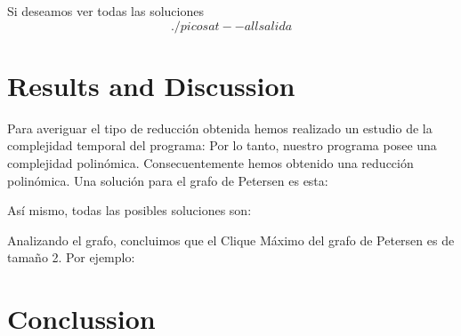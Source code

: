 \documentclass{article}
\begin{document}
        Si deseamos ver todas las soluciones 
        \[./picosat --all salida\]


\section{Results and Discussion}
    Para averiguar el tipo de reducción obtenida hemos realizado un estudio de la complejidad temporal del programa: 
    Por lo tanto, nuestro programa posee una complejidad polinómica. Consecuentemente hemos obtenido una reducción polinómica.
    Una solución para el grafo de Petersen es esta: 

    Así mismo, todas las posibles soluciones son: 
    
    Analizando el grafo, concluimos que el Clique Máximo del grafo de Petersen es de tamaño 2. Por ejemplo: 
    
    


\section{Conclussion}
 

\end{document}
